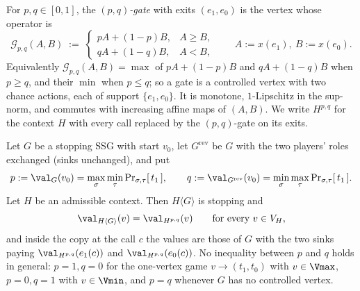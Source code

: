 \begin{definition}\label{def:fs16-gate}
For $p,q\in[0,1]$, the \emph{$(p,q)$-gate} with exits $(e_1,e_0)$ is the vertex
whose operator is
\[
  \mathcal{G}_{p,q}(A,B)\;:=\;
  \begin{cases} pA+(1-p)B, & A\ge B,\\ qA+(1-q)B, & A<B,\end{cases}
  \qquad A:=x(e_1),\ B:=x(e_0).
\]
Equivalently $\mathcal{G}_{p,q}(A,B)=\max$ of $pA+(1-p)B$ and $qA+(1-q)B$ when
$p\ge q$, and their $\min$ when $p\le q$; so a gate is a controlled vertex with
two chance actions, each of support $\{e_1,e_0\}$. It is monotone,
$1$-Lipschitz in the sup-norm, and commutes with increasing affine maps of
$(A,B)$. We write $H^{p,q}$ for the context $H$ with every call replaced by the
$(p,q)$-gate on its exits.
\end{definition}

\begin{lemma}\label{lem:fs16-gate}
Let $G$ be a stopping SSG with start $v_0$, let $G^{\mathrm{rev}}$ be $G$ with
the two players' roles exchanged (sinks unchanged), and put
\[
  p:=\val_G(v_0)=\max_\sigma\min_\tau\Pr\nolimits_{\sigma,\tau}[\,t_1\,],
  \qquad
  q:=\val_{G^{\mathrm{rev}}}(v_0)=\min_\sigma\max_\tau\Pr\nolimits_{\sigma,\tau}[\,t_1\,].
\]
Let $H$ be an admissible context. Then $H\langle G\rangle$ is stopping and
\[
  \val_{H\langle G\rangle}(v)=\val_{H^{p,q}}(v)\qquad\text{for every }v\in V_H,
\]
and inside the copy at the call $c$ the values are those of $G$ with the two
sinks paying $\val_{H^{p,q}}(e_1(c))$ and $\val_{H^{p,q}}(e_0(c))$.
No inequality between $p$ and $q$ holds in general: $p=1,q=0$ for the
one-vertex game $v\to(t_1,t_0)$ with $v\in\Vmax$, $p=0,q=1$ with $v\in\Vmin$,
and $p=q$ whenever $G$ has no controlled vertex.
\end{lemma}

